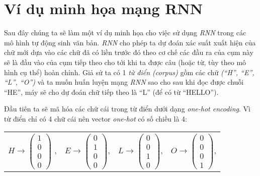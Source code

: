 
\def\a#1{$a^{<#1>}$}
\def\y#1{$\widehat{y}^{<#1>}$}
\def\x#1{$x^{<#1>}$}
\def\wax{$W_{ax}$}
\def\waa{$W_{aa}$}
\def\wya{$W_{ya}$}
\def\ba{$b_{a}$}
\def\by{$b_{y}$}

\section{Ví dụ minh họa mạng RNN}
Sau đây chúng ta sẽ làm một ví dụ minh họa cho việc sử dụng \textit{RNN} trong các mô hình tự động sinh văn bản. \textit{RNN} cho phép ta dự đoán xác suất xuất hiện của chữ mới dựa vào các chữ đã có liền trước đó theo cơ chế các đầu ra của cụm này sẽ là đầu vào của cụm tiếp theo cho tới khi ta được câu (hoặc từ, tùy theo mô hình cụ thể) hoàn chỉnh. Giả sử ta có 1 \textit{từ điển (corpus)} gồm các chữ\textit{ (``H'', ``E'', ``L'', ``O'')} và ta muốn huấn luyện mạng \textit{RNN} sao cho sau khi đọc được chuỗi ``HE'', máy sẽ cho dự đoán chữ tiếp theo là ``L'' (để có từ ``HELLO'').

Đầu tiên ta sẽ mã hóa các chữ cái trong từ điển dưới dạng \textit{one-hot encoding}. Vì từ điển chỉ có 4 chữ cái nên vector \textit{one-hot} có số chiều là 4:
\begin{center}
\begin{tabular}{ c c c c}
   $H \longrightarrow \begin{pmatrix} 1 \\ 0 \\ 0 \\ 0 \end{pmatrix} $ ,
   &
   $E \longrightarrow \begin{pmatrix} 0 \\ 1 \\ 0 \\ 0 \end{pmatrix} $,
   &
   $L \longrightarrow \begin{pmatrix} 0 \\ 0 \\ 1 \\ 0 \end{pmatrix} $,
   &
   $O \longrightarrow \begin{pmatrix} 0 \\ 0 \\ 0 \\ 1 \end{pmatrix} $,
\end{tabular}
\end{center}

